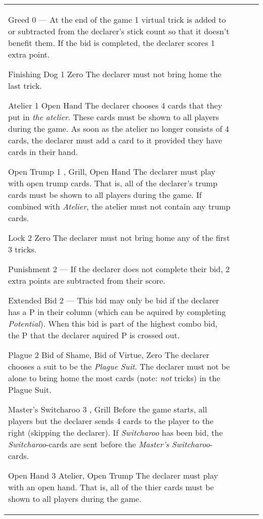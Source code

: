 \begin{table}
\begin{center}
\begin{tabularx}{\textwidth}{
			l
			S[table-number-alignment=center, table-figures-decimal=0]
			p{3cm}
			|X
		}
			\specialBidItem%
			{Greed}
			{0}
			{---}
			{%
				At the end of the game 1 virtual trick is added to or subtracted from the declarer's stick count so that it doesn't benefit them. If the bid is completed, the declarer scores 1 extra point.
			}

			\specialBidItem%
			{Finishing Dog}
			{1}
			{Zero}
			{%
				The declarer must not bring home the last trick.
			}

			\specialBidItem%
			{Atelier}
			{1}
			{Open Hand}
			{%
				The declarer chooses 4 cards that they put in \emph{the atelier}. These cards must be shown to all players during the game. As soon as the atelier no longer consists of 4 cards, the declarer must add a card to it provided they have cards in their hand.
			}

			\specialBidItem%
			{Open Trump}
			{1}
			{\nonTrump, Grill, Open Hand}
			{%
				The declarer must play with open trump cards. That is, all of the declarer’s trump cards must be shown to all players during the game. If combined with \emph{Atelier}, the atelier must not contain any trump cards.
			}

			\specialBidItem%
			{Lock}
			{2}
			{Zero}
			{%
				The declarer must not bring home any of the first 3 tricks.
			}

			\specialBidItem%
			{Punishment}
			{2}
			{---}
			{%
				If the declarer does not complete their bid, 2 extra points are subtracted from their score.
			}

			\specialBidItem%
			{Extended Bid}
			{2}
			{---}
			{%
				This bid may only be bid if the declarer has a P in their column (which can be aquired by completing \emph{Potential}). When this bid is part of the highest combo bid, the P that the declarer aquired P is crossed out.
			}

			\specialBidItem%
			{Plague}
			{2}
			{Bid of Shame, Bid of Virtue, Zero}
			{%
				The declarer chooses a suit to be the \emph{Plague Suit}. The declarer must not be alone to bring home the most cards (note: \emph{not} tricks) in the Plague Suit.
			}

			\specialBidItem%
			{Master's Switcharoo}
			{3}
			{\nonTrump, Grill}
			{%
				Before the game starts, all players but the declarer sends 4 cards to the player to the right (skipping the declarer). If \emph{Switcharoo} has been bid, the \emph{Switcharoo}-cards are sent before the \emph{Master's Switcharoo}-cards.
			}

			\specialBidItem%
			{Open Hand}
			{3}
			{Atelier, Open Trump}
			{%
				The declarer must play with an open hand. That is, all of the thier cards must be shown to all players during the game.
			}
		\end{tabularx}
	\end{center}
\end{table}
